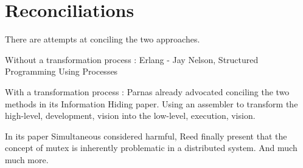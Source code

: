 \section{Reconciliations}

There are attempts at conciling the two approaches.

Without a transformation process :
Erlang - Jay Nelson, Structured Programming Using Processes

With a transformation process :
Parnas already advocated conciling the two methods in its Information Hiding paper.
Using an assembler to transform the high-level, development, vision into the low-level, execution, vision.





In its paper Simultaneous considered harmful, Reed finally present that the concept of mutex is inherently problematic in a distributed system.
And much much more.